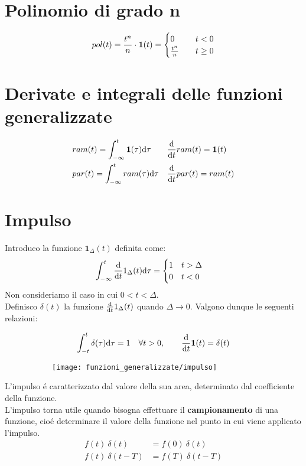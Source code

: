 \documentclass[../main.tex]{subfiles}
\begin{document}
	\section{Polinomio di grado n}
		\[
			pol(t)=\frac{t^n}{n} \cdot \gr =
			\begin{cases}
				0 \quad &t<0
				\\
				\frac{t^n}{n} \quad &t\geq 0
			\end{cases}
		\]
		
	\section{Derivate e integrali delle funzioni generalizzate}
		\begin{align*}
			&ram(t) = \int_{- \infty}^{t} \gr[\tau] \mathrm{d}\tau &&\der{}{t} ram(t) = \gr
			\\
			&par(t) = \int_{- \infty}^{t} ram(\tau) \mathrm{d} \tau &&\der{}{t} par(t) = ram(t)	
		\end{align*}
		
	\section{Impulso}
		Introduco la funzione $ \textbf{1}_{\Delta}(t) $ definita come:
		\[
			\int_{- \infty}^{t} \der{}{t}1_{\Delta}(t) \mathrm{d}\tau=
			\begin{cases}
				1 \quad t>\Delta\\
				0 \quad t<0
			\end{cases}
		\]
		Non consideriamo il caso in cui $ 0<t<\Delta $.\\
		\linebreak
		Definisco $ \delta(t) $ la funzione $ \der{}{t}1_{\Delta}(t) $ quando $ \Delta \longrightarrow 0 $. Valgono dunque le seguenti relazioni: 
		\begin{figure}[H]
			\centering
			\begin{subfigure}{0.5\textwidth}
				\[
					\int_{-t}^{t} \delta(\tau) \mathrm{d}\tau =1 \quad \forall t>0, \qquad \der{}{t} \gr = \delta(t)
				\]
			\end{subfigure}
			\begin{subfigure}{0.4\textwidth}
				\texttt{[image: funzioni\_generalizzate/impulso]}
			\end{subfigure}
		\end{figure}
		L'impulso \'e caratterizzato dal valore della sua area, determinato dal coefficiente della funzione.\\
		\linebreak
		L'impulso torna utile quando bisogna effettuare il \textbf{campionamento} di una funzione, cio\'e determinare il valore della funzione nel punto in cui viene applicato l'impulso.
		\begin{align*}
			f(t)\ \delta(t) &= f(0)\ \delta(t)\\
			f(t)\ \delta(t - T) &= f(T)\ \delta(t - T)   
		\end{align*}
		
\end{document}
